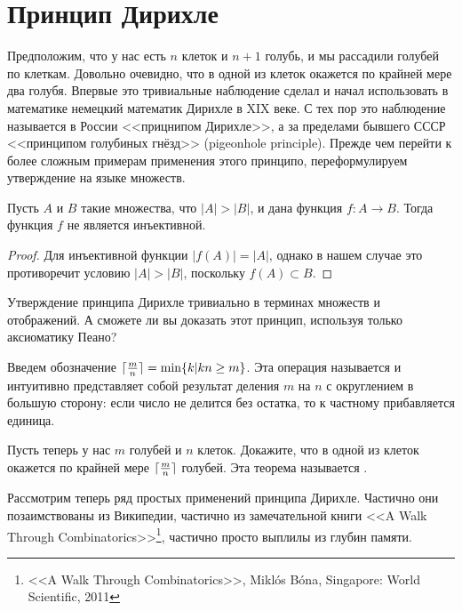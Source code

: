 \section{Принцип Дирихле}

Предположим, что у нас есть $n$ клеток и $n+1$ голубь, и мы рассадили голубей по клеткам. Довольно очевидно, что в одной из клеток окажется по крайней мере два голубя. Впервые это тривиальные наблюдение сделал и начал использовать в математике немецкий математик Дирихле в XIX веке. С тех пор это наблюдение называется в России <<прицнипом Дирихле>>, а за пределами бывшего СССР <<принципом голубиных гнёзд>> (pigeonhole principle). Прежде чем перейти к более сложным примерам применения этого принципо, переформулируем утверждение на языке множеств.

\begin{thm}
Пусть $A$ и $B$ такие множества, что $|A|>|B|$, и дана функция $f:A\to B$. Тогда функция $f$ не является инъективной.
\end{thm}
\begin{proof}
Для инъективной функции $|f(A)| = |A|$, однако в нашем случае это противоречит условию $|A|>|B|$, поскольку $f(A)\subset B$.
\end{proof}

\begin{exercise}
Утверждение принципа Дирихле тривиально в терминах множеств и отображений. А сможете ли вы доказать этот принцип, используя только аксиоматику Пеано?
\end{exercise}

Введем обозначение $\lceil {m\over n} \rceil = \min\{k|kn\ge m\}$. Эта операция называется  и интуитивно представляет собой результат деления $m$ на $n$ с округлением в большую сторону: если число не делится без остатка, то к частному прибавляется единица.

\begin{exercise}
Пусть теперь у нас $m$ голубей и $n$ клеток. Докажите, что в одной из клеток окажется по крайней мере $\lceil{m\over n}\rceil$ голубей. Эта теорема называется .
\end{exercise}

Рассмотрим теперь ряд простых применений принципа Дирихле. Частично они позаимствованы из Википедии, частично из замечательной книги <<A Walk Through Combinatorics>>\footnote{<<A Walk Through Combinatorics>>, Miklós Bóna, Singapore: World Scientific, 2011}, частично просто выплилы из глубин памяти.

